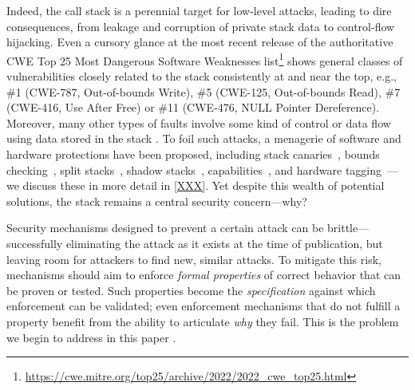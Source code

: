 Indeed, the call stack is a perennial target for low-level attacks, leading to
dire consequences, from leakage and corruption of private stack data
to control-flow hijacking.
%
Even a cursory glance at the most recent release of the authoritative CWE Top 25
Most Dangerous Software Weaknesses
list\footnote{\url{https://cwe.mitre.org/top25/archive/2022/2022_cwe_top25.html}}
shows general classes of vulnerabilities closely related to the stack 
consistently at and near the top, e.g., \#1 (CWE-787, Out-of-bounds Write), \#5 (CWE-125, Out-of-bounds Read), \#7 (CWE-416, Use
After Free) or \#11 (CWE-476, NULL Pointer Dereference).
%
Moreover, many other types of faults involve some kind of control or data flow
using data stored in the stack .
%
To foil such attacks, a menagerie of
software and hardware protections have been proposed,
%
including stack canaries~\cite{Cowan+98},
bounds checking~\cite{NagarakatteZMZ09,NagarakatteZMZ10,DeviettiBMZ08},
split stacks~\cite{Kuznetsov+14},
shadow stacks~\cite{Dang+15,Shanbhogue+19},
capabilities~\cite{Woodruff+14,Chisnall+15,SkorstengaardLocal,SkorstengaardSTKJFP,Georges+21},
and hardware tagging~\cite{DBLP:conf/sp/RoesslerD18}---we discuss these in more
detail in \cref{XXX}.
  \ifaftersubmission{}
\fi
%
%
Yet despite this wealth of potential solutions, the stack remains a central
security concern---why?

Security mechanisms designed to prevent a certain attack can be brittle---successfully
eliminating the attack as it exists at the time of publication, but leaving room for attackers
to find new, similar attacks.
%
%
To mitigate this risk,  mechanisms should aim to enforce \emph{formal
properties} of correct  behavior that can be proven or tested. Such properties become the
\emph{specification} against which enforcement can be validated; even enforcement mechanisms that do
not fulfill a property benefit from the ability to articulate \emph{why} they fail.
%
%
This is the problem we begin to address in this paper .

